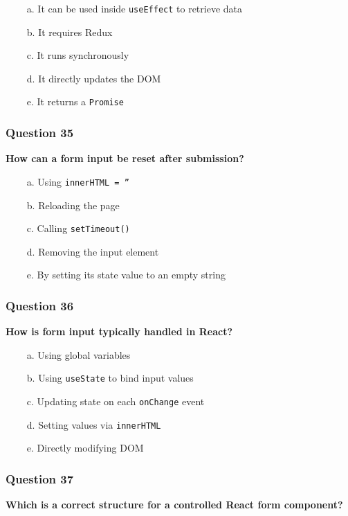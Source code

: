 \documentclass{article}
\newcommand{\cmark}{\textcolor{green}{\ding{51}}} %
\newcommand{\xmark}{\textcolor{red}{\ding{55}}}   %
\begin{document}
\begin{itemize}
  \item[\cmark\ a.] It can be used inside \texttt{useEffect} to retrieve data
  \item[\xmark\ b.] It requires Redux
  \item[\xmark\ c.] It runs synchronously
  \item[\xmark\ d.] It directly updates the DOM
  \item[\cmark\ e.] It returns a \texttt{Promise}
\end{itemize}

\subsubsection*{Question 35}
\textbf{How can a form input be reset after submission?}

\begin{itemize}
  \item[\xmark\ a.] Using \texttt{innerHTML = ''}
  \item[\xmark\ b.] Reloading the page
  \item[\xmark\ c.] Calling \texttt{setTimeout()}
  \item[\xmark\ d.] Removing the input element
  \item[\cmark\ e.] By setting its state value to an empty string
\end{itemize}

\subsubsection*{Question 36}
\textbf{How is form input typically handled in React?}

\begin{itemize}
  \item[\xmark\ a.] Using global variables
  \item[\cmark\ b.] Using \texttt{useState} to bind input values
  \item[\cmark\ c.] Updating state on each \texttt{onChange} event
  \item[\xmark\ d.] Setting values via \texttt{innerHTML}
  \item[\xmark\ e.] Directly modifying DOM
\end{itemize}

\subsubsection*{Question 37}
\textbf{Which is a correct structure for a controlled React form component?}
\end{document}
